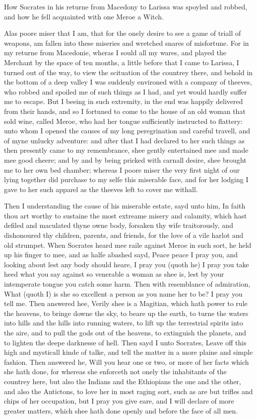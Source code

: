 How Socrates in his returne from Macedony to Larissa was spoyled and robbed,
and how he fell acquainted with one Meroe a Witch.

Alas poore miser that I am, that for the onely desire to see a game of triall
of weapons, am fallen into these miseries and wretched snares of misfortune.
For in my returne from Macedonie, wheras I sould all my wares, and played the
Merchant by the space of ten months, a little before that I came to Larissa, I
turned out of the way, to view the scituation of the countrey there, and behold
in the bottom of a deep valley I was suddenly environed with a company of
theeves, who robbed and spoiled me of such things as I had, and yet would
hardly suffer me to escape. But I beeing in such extremity, in the end was
happily delivered from their hands, and so I fortuned to come to the house of
an old woman that sold wine, called Meroe, who had her tongue sufficiently
instructed to flattery: unto whom I opened the causes of my long peregrination
and careful travell, and of myne unlucky adventure: and after that I had
declared to her such things as then presently came to my remembrance, shee
gently entertained mee and made mee good cheere; and by and by being pricked
with carnall desire, shee brought me to her own bed chamber; whereas I poore
miser the very first night of our lying together did purchase to my selfe this
miserable face, and for her lodging I gave to her such apparel as the theeves
left to cover me withall.

Then I understanding the cause of his miserable estate, sayd unto him, In faith
thou art worthy to sustaine the most extreame misery and calamity, which hast
defiled and maculated thyne owne body, forsaken thy wife traitorously, and
dishonoured thy children, parents, and friends, for the love of a vile harlot
and old strumpet. When Socrates heard mee raile against Meroe in such sort, he
held up his finger to mee, and as halfe abashed sayd, Peace peace I pray you,
and looking about lest any body should heare, I pray you (quoth he) I pray you
take heed what you say against so venerable a woman as shee is, lest by your
intemperate tongue you catch some harm. Then with resemblance of admiration,
What (quoth I) is she so excellent a person as you name her to be? I pray you
tell me. Then answered hee, Verily shee is a Magitian, which hath power to rule
the heavens, to bringe downe the sky, to beare up the earth, to turne the
waters into hills and the hills into running waters, to lift up the terrestrial
spirits into the aire, and to pull the gods out of the heavens, to extinguish
the planets, and to lighten the deepe darknesse of hell. Then sayd I unto
Socrates, Leave off this high and mysticall kinde of talke, and tell the matter
in a more plaine and simple fashion. Then answered he, Will you hear one or
two, or more of her facts which she hath done, for whereas she enforceth not
onely the inhabitants of the countrey here, but also the Indians and the
Ethiopians the one and the other, and also the Antictons, to love her in most
raging sort, such as are but trifles and chips of her occupation, but I pray
you give eare, and I will declare of more greater matters, which shee hath done
openly and before the face of all men.

